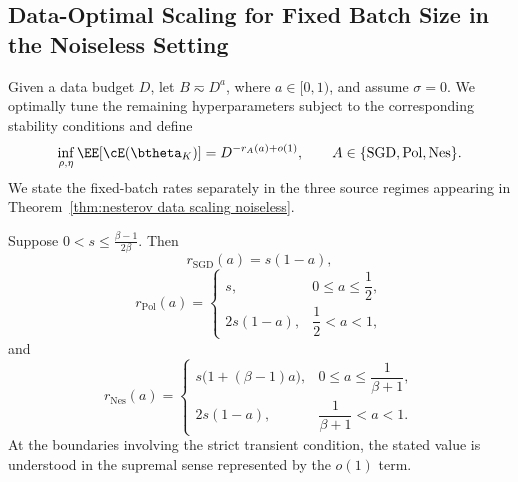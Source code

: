 \subsection{Data-Optimal Scaling for Fixed Batch Size in the Noiseless Setting}
\label{app:fix_bsz_noiseless}

Given a data budget \(D\), let \(B\eqsim D^a\), where \(a\in[0,1)\), and assume \(\sigma=0\). We optimally tune the remaining hyperparameters subject to the corresponding stability conditions and define
\[
\inf_{\rho,\eta}
\EE[\cE(\btheta_K)]
=
D^{-r_A(a)+o(1)},
\qquad
A\in\{\mathrm{SGD},\mathrm{Pol},\mathrm{Nes}\}.
\]
We state the fixed-batch rates separately in the three source regimes appearing in Theorem~\ref{thm:nesterov data scaling noiseless}.

\begin{theorem}
\label{thm:fixed-batch-data-scaling-noiseless-hard}
Suppose
\(0<s\leq\frac{\beta-1}{2\beta}.\)
Then
\[
r_{\mathrm{SGD}}(a)=s(1-a),
\]
\[
r_{\mathrm{Pol}}(a)
=
\begin{cases}
s,
&0\leq a\leq\dfrac12,\\[1mm]
2s(1-a),
&\dfrac12<a<1,
\end{cases}
\]
and
\[
r_{\mathrm{Nes}}(a)
=
\begin{cases}
s\bigl(1+(\beta-1)a\bigr),
&0\leq a\leq\dfrac1{\beta+1},\\[2mm]
2s(1-a),
&\dfrac1{\beta+1}<a<1.
\end{cases}
\]
At the boundaries involving the strict transient condition, the stated value is understood in the supremal sense represented by the \(o(1)\) term.
\end{theorem}

